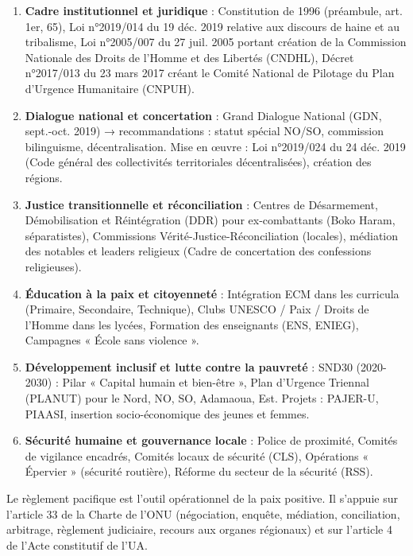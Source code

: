 \documentclass[11pt]{article}
\newcounter{popsec}
\newcounter{popsub}
\newcommand{\courssub}[1]{%
  \stepcounter{popsub}%
  \par\vspace{9pt}\noindent{\popxbold\fontsize{11.5}{13}\selectfont\color{popink}{\color{poporange}\thepopsec.\thepopsub}\hspace{6pt}#1}\par\nopagebreak\vspace{4pt}
}
\begin{document}
\begin{propriete}
\begin{enumerate}
    \item \textbf{Cadre institutionnel et juridique} : Constitution de 1996 (préambule, art. 1er, 65), Loi n°2019/014 du 19 déc. 2019 relative aux discours de haine et au tribalisme, Loi n°2005/007 du 27 juil. 2005 portant création de la Commission Nationale des Droits de l'Homme et des Libertés (CNDHL), Décret n°2017/013 du 23 mars 2017 créant le Comité National de Pilotage du Plan d'Urgence Humanitaire (CNPUH).
    \item \textbf{Dialogue national et concertation} : Grand Dialogue National (GDN, sept.-oct. 2019) → recommandations : statut spécial NO/SO, commission bilinguisme, décentralisation. Mise en œuvre : Loi n°2019/024 du 24 déc. 2019 (Code général des collectivités territoriales décentralisées), création des régions.
    \item \textbf{Justice transitionnelle et réconciliation} : Centres de Désarmement, Démobilisation et Réintégration (DDR) pour ex-combattants (Boko Haram, séparatistes), Commissions Vérité-Justice-Réconciliation (locales), médiation des notables et leaders religieux (Cadre de concertation des confessions religieuses).
    \item \textbf{Éducation à la paix et citoyenneté} : Intégration ECM dans les curricula (Primaire, Secondaire, Technique), Clubs UNESCO / Paix / Droits de l'Homme dans les lycées, Formation des enseignants (ENS, ENIEG), Campagnes « École sans violence ».
    \item \textbf{Développement inclusif et lutte contre la pauvreté} : SND30 (2020-2030) : Pilar « Capital humain et bien-être », Plan d'Urgence Triennal (PLANUT) pour le Nord, NO, SO, Adamaoua, Est. Projets : PAJER-U, PIAASI, insertion socio-économique des jeunes et femmes.
    \item \textbf{Sécurité humaine et gouvernance locale} : Police de proximité, Comités de vigilance encadrés, Comités locaux de sécurité (CLS), Opérations « Épervier » (sécurité routière), Réforme du secteur de la sécurité (RSS).
\end{enumerate}
\end{propriete}

\courssub{Le règlement pacifique des différends}

Le règlement pacifique est l'outil opérationnel de la paix positive. Il s'appuie sur l'article 33 de la Charte de l'ONU (négociation, enquête, médiation, conciliation, arbitrage, règlement judiciaire, recours aux organes régionaux) et sur l'article 4 de l'Acte constitutif de l'UA.
\end{document}

